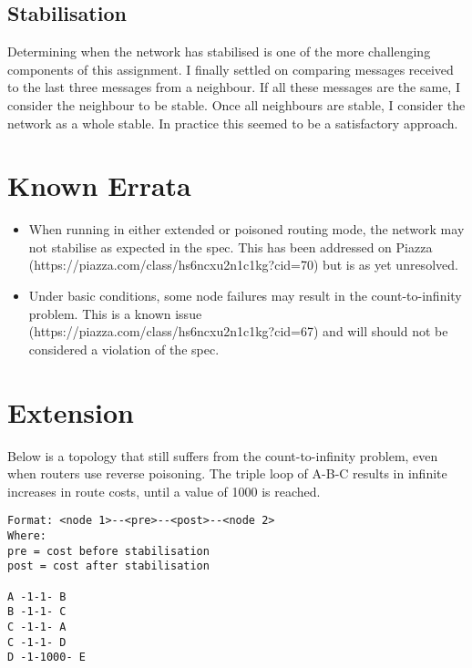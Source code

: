 \documentclass{article}
\begin{document}
\subsection*{Stabilisation}

Determining when the network has stabilised is one of the more challenging components of this assignment. I finally settled on comparing messages received to the last three messages from a neighbour. If all these messages are the same, I consider the neighbour to be stable. Once all neighbours are stable, I consider the network as a whole stable. In practice this seemed to be a satisfactory approach.

\section*{Known Errata}

\begin{itemize}

  \item When running in either extended or poisoned routing mode, the network may not stabilise as expected in the spec. This has been addressed on Piazza (https://piazza.com/class/hs6ncxu2n1c1kg?cid=70) but is as yet unresolved.
  
  \item Under basic conditions, some node failures may result in the count-to-infinity problem. This is a known issue \\(https://piazza.com/class/hs6ncxu2n1c1kg?cid=67) and will should not be considered a violation of the spec.

\end{itemize}

\section*{Extension}

Below is a topology that still suffers from the count-to-infinity problem, even when routers use reverse poisoning. The triple loop of A-B-C results in infinite increases in route costs, until a value of 1000 is reached.

\begin{lstlisting}
Format: <node 1>--<pre>--<post>--<node 2> 
Where: 
pre = cost before stabilisation
post = cost after stabilisation

A -1-1- B
B -1-1- C
C -1-1- A
C -1-1- D
D -1-1000- E
\end{lstlisting}
\end{document}
